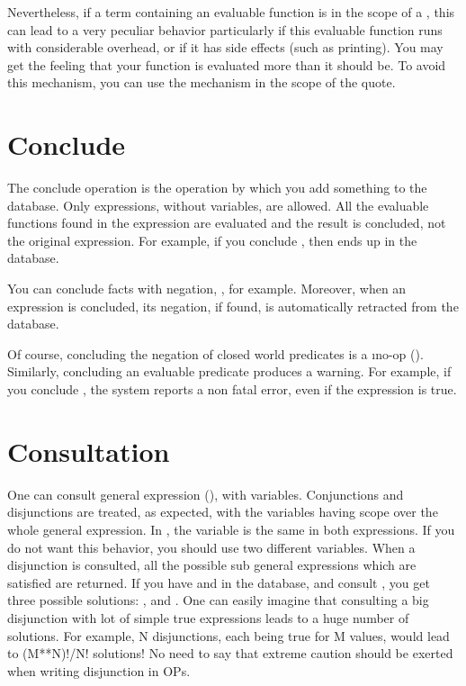 Nevertheless, if a term containing an evaluable function is in the scope of a
, this can lead to a very peculiar behavior particularly if this
evaluable function runs with considerable overhead, or if it has side effects
(such as printing). You may get the feeling that your function is evaluated
more than it should be. To avoid this mechanism, you can use the 
mechanism in the scope of the quote.

\section{Conclude}

The conclude operation is the operation by which you add something to the
database. Only expressions, without variables, are allowed. All the evaluable
functions found in the expression are evaluated and the result is concluded,
not the original expression. For example, if you conclude , then  ends up in the database.

You can conclude facts with negation, , for example.
Moreover, when an expression is concluded, its negation, if found, is
automatically retracted from the database.

Of course, concluding the negation of closed world predicates is a
\i{no-op} (). Similarly, concluding an
evaluable predicate produces a warning. For example, if you conclude
, the system reports a non fatal error, even if the
expression is true.

\section{Consultation}

One can consult general expression (), with
variables. Conjunctions and disjunctions are treated, as expected, with the
variables having scope over the whole general expression. In , the  variable is the same in both expressions.  If
you do not want this behavior, you should use two different variables.  When a
disjunction is consulted, all the possible sub general expressions which are
satisfied are returned. If you have  and  in
the database, and consult , you get three
possible solutions: ,  and
. One can easily imagine that consulting a big disjunction
with lot of simple true expressions leads to a huge number of solutions. For
example, N disjunctions, each being true for M values, would lead to (M**N)!/N!
solutions! No need to say that extreme caution should be exerted when writing
disjunction in OPs.

